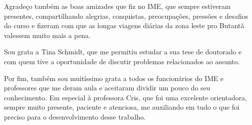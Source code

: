 \documentclass[a4paper,12pt]{article}
\begin{document}
Agradeço também as boas amizades que fiz no IME, que sempre 
estiveram presentes, compartilhando
alegrias, conquistas, preocupações, pressões e desafios do curso
e fizeram com que as longas viagens diárias da zona leste pro Butantã 
valessem muito mais a pena.

Sou grata a Tina Schmidt, que me permitiu estudar a sua tese de doutorado e
com quem tive a oportunidade de discutir problemas relacionados ao assunto.

Por fim, também sou muitíssimo grata a todos os funcionários do IME e professores que
me deram aula e aceitaram dividir um pouco do seu conhecimento.
Em especial à professora Cris, que foi uma excelente orientadora,
sempre muito presente, paciente e atenciosa, me auxiliando em tudo
o que foi preciso para o desenvolvimento desse trabalho.
\end{document}
